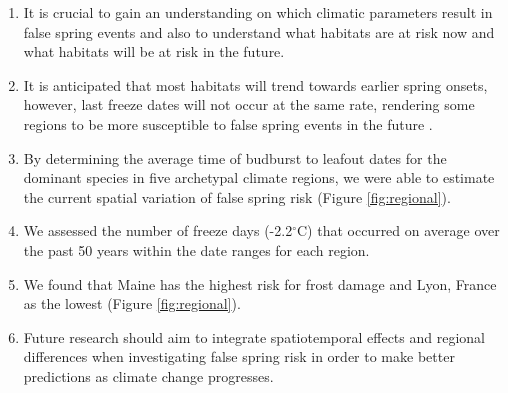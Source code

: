\documentclass{article}\usepackage[]{graphicx}\usepackage[]{color}
\begin{document}
\begin{enumerate}
\begin{enumerate}
\item It is crucial to gain an understanding on which climatic parameters result in false spring events and also to understand what habitats are at risk now and what habitats will be at risk in the future. 
\item It is anticipated that most habitats will trend towards earlier spring onsets, however, last freeze dates will not occur at the same rate, rendering some regions to be more susceptible to false spring events in the future \citep{Labe2016}.
\item By determining the average time of budburst to leafout dates for the dominant species in five archetypal climate regions, we were able to estimate the current spatial variation of false spring risk (Figure \ref{fig:regional}).
\item We assessed the number of freeze days (-2.2$^{\circ}$C) \citep{Schwartz1993} that occurred on average over the past 50 years within the date ranges for each region.
\item We found that Maine has the highest risk for frost damage and Lyon, France as the lowest (Figure \ref{fig:regional}). 
\item Future research should aim to integrate spatiotemporal effects and regional differences when investigating false spring risk in order to make better predictions as climate change progresses.
\end {enumerate}
\end{enumerate}

\end{document}
